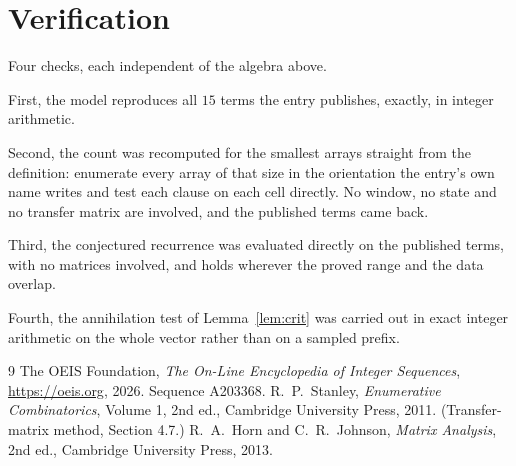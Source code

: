 \documentclass[11pt,a4paper]{article}
\theoremstyle{plain}
\theoremstyle{definition}
\begin{document}
\section{Verification}

Four checks, each independent of the algebra above.

First, the model reproduces all $15$ terms the entry publishes, exactly, in integer
arithmetic.

Second, the count was recomputed for the smallest arrays straight from the definition:
enumerate every array of that size in the orientation the entry's own name writes and test each
clause on each cell directly. No window, no state and no transfer matrix are involved, and the
published terms came back.

Third, the conjectured recurrence was evaluated directly on the published terms, with no
matrices involved, and holds wherever the proved range and the data overlap.

Fourth, the annihilation test of Lemma~\ref{lem:crit} was carried out in exact integer
arithmetic on the whole vector rather than on a sampled prefix.

\begin{thebibliography}{9}
 The OEIS Foundation, \emph{The On-Line Encyclopedia of Integer
Sequences}, \url{https://oeis.org}, 2026. Sequence A203368.
 R.~P.~Stanley, \emph{Enumerative Combinatorics}, Volume 1, 2nd ed.,
Cambridge University Press, 2011. (Transfer-matrix method, Section 4.7.)
 R.~A.~Horn and C.~R.~Johnson, \emph{Matrix Analysis}, 2nd ed., Cambridge
University Press, 2013.
\end{thebibliography}
\end{document}
